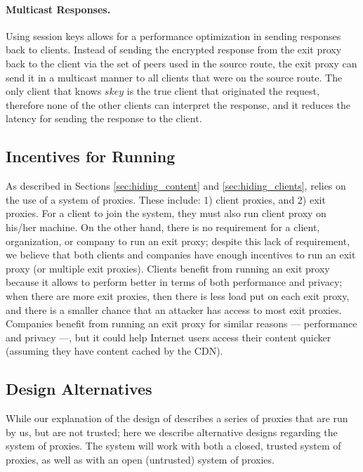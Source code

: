 \paragraph{Multicast Responses.}
Using session keys allows for a performance optimization in sending responses back to clients.  Instead of sending 
the encrypted response from the exit proxy back to the client via the set of peers used in the source route, the exit 
proxy can send it in a multicast manner to all clients that were on the source route.  The only client that knows $skey$ 
is the true client that originated the request, therefore none of the other clients can interpret the response, and it reduces the 
latency for sending the response to the client.  

\subsection{Incentives for Running \system{}}
As described in Sections \ref{sec:hiding_content} and \ref{sec:hiding_clients}, \system{} relies 
on the use of a system of proxies.  These include: 1) client proxies, and 2) exit proxies.  For a client 
to join the system, they must also run client proxy on his/her machine.  On the other hand, there is no 
requirement for a client, organization, or company to run an exit proxy; despite this lack of requirement, we 
believe that both clients and companies have enough incentives to run an exit proxy (or multiple exit proxies).  
Clients benefit from running an exit proxy because it allows \system{} to perform better in terms of both 
performance and privacy; when there are more exit proxies, then there is less load put on each exit proxy, and there is a smaller
chance that an attacker has access to most exit proxies.  Companies benefit from running an exit proxy for similar 
reasons --- performance and privacy ---, but it could help Internet users access their content quicker (assuming they have 
content cached by the CDN).    

\subsection{Design Alternatives}
While our explanation of the design of \system{} describes a series of proxies that are run by us, but are not 
trusted; here we describe alternative designs regarding the system of proxies.  The system will work with both a closed, 
trusted system of proxies, as well as with an open (untrusted) system of proxies.

